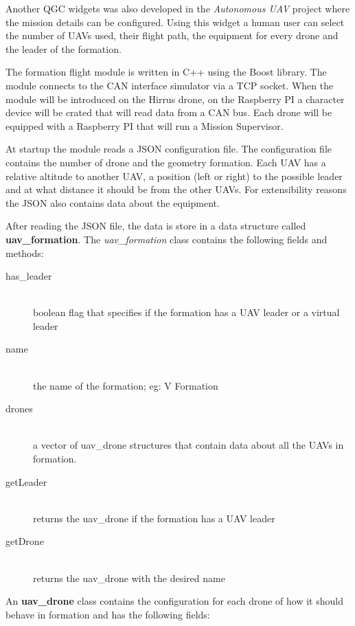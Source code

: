 Another QGC widgets was also developed in the \textit{Autonomous UAV} project
where the mission details can be configured. Using this widget a human user
can select the number of UAVs used, their flight path, the equipment for every
drone and the leader of the formation.

The formation flight module is written in C++ using the Boost library. The 
module connects to the CAN interface simulator via a TCP socket. When the module
will be introduced on the Hirrus drone, on the Raspberry PI a character device
will be crated that will read data from a CAN bus. Each drone will be equipped
with a Raspberry PI that will run a Mission Supervisor.

At startup the module reads a JSON configuration file. The configuration
file contains the number of drone and the geometry formation. Each UAV has
a relative altitude to another UAV, a position (left or right) to the possible 
leader and at what distance it should be from the other UAVs. For extensibility
reasons the JSON also contains data about the equipment.

After reading the JSON file, the data is store in a data structure called 
\textbf{uav_formation}. The \textit{uav_formation} class contains the following fields
and methods:

\begin{description}
\item [has_leader] \hfill \\ boolean flag that specifies if the formation has a UAV leader
or a virtual leader
\item [name] \hfill \\ the name of the formation; eg: V Formation
\item [drones] \hfill \\ a vector of uav_drone structures that contain data about all the
UAVs in formation.
\item [getLeader] \hfill \\ returns the uav_drone if the formation has a UAV leader
\item [getDrone] \hfill \\ returns the uav_drone with the desired name
\end{description}

\newpage
An \textbf{uav_drone} class contains the configuration for each drone of how it
should behave in formation and has the following fields:

